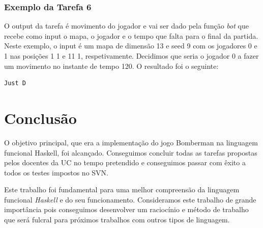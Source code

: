 \documentclass[a4paper]{article}
\begin{document}
\subsubsection{Exemplo da Tarefa 6}

O output da tarefa é movimento do jogador e vai ser dado pela função \emph{bot} que recebe como input o mapa, o jogador e o tempo que falta para o final da partida. Neste exemplo, o input é um mapa de dimensão 13 e seed 9 com os jogadores 0 e 1 nas posições 1 1 e 11 1, respetivamente. Decidimos que seria o jogador 0 a fazer um movimento no instante de tempo 120. O resultado foi o seguinte:

\begin{verbatim}
Just D
\end{verbatim}

\section{Conclusão}
O objetivo principal, que era a implementação do jogo Bomberman na linguagem funcional Haskell, foi alcançado. Conseguimos concluir todas as tarefas propostas pelos docentes da UC no tempo pretendido e conseguimos passar com êxito a todos os testes impostos no SVN.\par Este trabalho foi fundamental para uma melhor compreensão da linguagem funcional \emph{Haskell} e do seu funcionamento. Consideramos este trabalho de grande importância pois conseguimos desenvolver um raciocínio e método de trabalho que será fulcral para próximos trabalhos com outros tipos de linguagem. 
\end{document}
